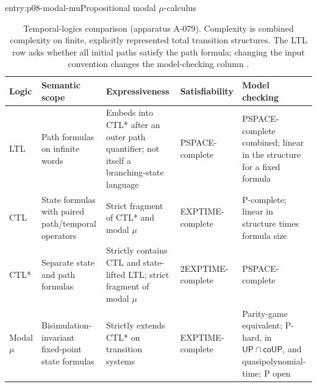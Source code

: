 \begin{systementry}{entry:p08-modal-mu}{Propositional modal \(\mu\)-calculus}
\end{systementry}

\begin{table}[!htbp]
\centering
\scriptsize
\begin{tabular}{@{}p{}p{}p{}p{}p{}@{}}
\toprule
Logic & Semantic scope & Expressiveness & Satisfiability & Model checking \\
\midrule
LTL & Path formulas on infinite words & Embeds into CTL* after an outer path
quantifier; not itself a branching-state language & PSPACE-complete &
PSPACE-complete combined; linear in the structure for a fixed formula \\
CTL & State formulas with paired path/temporal operators & Strict fragment of
CTL* and modal \(\mu\) & EXPTIME-complete & P-complete; linear in structure
times formula size \\
CTL* & Separate state and path formulas & Strictly contains CTL and state-lifted
LTL; strict fragment of modal \(\mu\) & 2EXPTIME-complete & PSPACE-complete \\
Modal \(\mu\) & Bisimulation-invariant fixed-point state formulas & Strictly
extends CTL* on transition systems & EXPTIME-complete & Parity-game equivalent;
P-hard, in \(\mathsf{UP}\cap\mathsf{coUP}\), and quasipolynomial-time; P open \\
\bottomrule
\end{tabular}
\caption{Temporal-logics comparison (apparatus A-079).  Complexity is combined
complexity on finite, explicitly represented total transition structures.
The LTL row asks whether all initial paths satisfy the path formula; changing
the input convention changes the model-checking column
\cite{SistlaClarke1985,ClarkeEmersonSistla1986,EmersonLei1987,
EmersonJutla1999,CaludeJainKhoussainovLiStephan2017}.}
\label{tab:p08-temporal-comparison}
\end{table}

